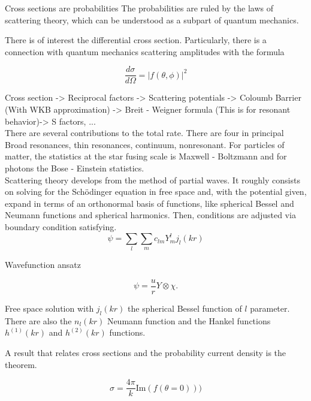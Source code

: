 \documentclass[openany]{book}
\begin{document}
Cross sections are probabilities 
The probabilities are ruled by the laws of scattering theory, which can be understood as a subpart of quantum mechanics. 

There is of interest the differential cross section. Particularly, there is a connection with quantum mechanics scattering amplitudes with the formula

\begin{equation}  \label{eq:diffCrossSection}
	\frac{d\sigma}{d\Omega} = |f(\theta, \phi)|^2
\end{equation}

Cross section -> Reciprocal factors -> Scattering potentials -> Coloumb Barrier (With WKB approximation) -> Breit - Weigner formula (This is for resonant behavior)-> S factors, ... \\ 

There are several contributions  to the total rate. There are four in principal 
Broad resonances, thin resonances, continuum, nonresonant. For particles of matter, the statistics at the star fusing scale is Maxwell - Boltzmann and for photons the Bose - Einstein statistics. \\ 

Scattering theory develops from the method of partial waves. It roughly consists on solving for the Schödinger equation in free space and, with the potential given, expand in terms of an orthonormal basis of functions, like spherical Bessel and Neumann functions and spherical harmonics. Then, conditions are adjusted via boundary condition satisfying. \\

\begin{equation}   \label{eq:partialWaveExpansion_definition}
	\psi = \sum_{l} \sum_{m} {c_{lm}Y_{m}^{l}j_l(kr)}
\end{equation}

Wavefunction ansatz 

\begin{equation} \label{eq:scattering_waveFunction}
	\psi = \frac{u}{r} Y \otimes \chi.
\end{equation}

Free space solution with $j_l(kr)$ the spherical Bessel function of $l$ parameter. There are also the $n_l(kr)$ Neumann function and the Hankel functions $h^{(1)}(kr)$ and $h^{(2)}(kr)$ functions.

A result that relates cross sections and the probability current density is the  theorem. 

\begin{equation}  \label{eq:crossSection_opticalTheorem}
	\sigma = \frac{4 \pi }{k} \mathrm{Im}(f(\theta = 0)))
\end{equation}
\end{document}
